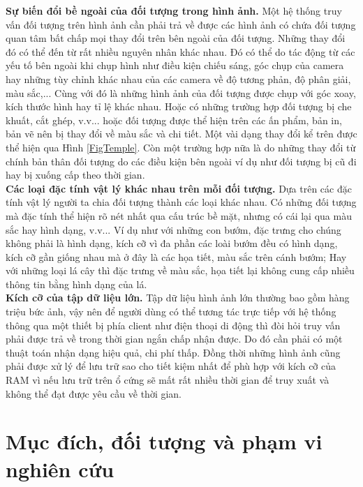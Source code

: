  \textbf{Sự biến đổi bề ngoài của đối tượng trong hình ảnh.} Một hệ thống truy vấn đối tượng trên hình ảnh cần phải trả về được các hình ảnh có chứa đối tượng quan tâm bất chấp mọi thay đổi trên bên ngoài của đối tượng. Những thay đổi đó có thể đến từ rất nhiều nguyên nhân khác nhau. Đó có thể do tác động từ các yếu tố bên ngoài khi chụp hình như điều kiện chiếu sáng, góc chụp của camera hay những tùy chỉnh khác nhau của các camera về độ tương phản, độ phân giải, màu sắc,... Cùng với đó là những hình ảnh của đối tượng được chụp với góc xoay, kích thước hình hay tỉ lệ khác nhau. Hoặc có những trường hợp đối tượng bị che khuất, cắt ghép, v.v... hoặc đối tượng được thể hiện trên các ấn phẩm, bản in, bản vẽ nên bị thay đổi về màu sắc và chi tiết. Một vài dạng thay đổi kể trên được thể hiện qua Hình \ref{FigTemple}. Còn một trường hợp nữa là do những thay đổi từ chính bản thân đối tượng do các điều kiện bên ngoài ví dụ như đối tượng bị cũ đi hay bị xuống cấp theo thời gian.\\ 
 \textbf{Các loại đặc tính vật lý khác nhau trên mỗi đối tượng.} Dựa trên các đặc tính vật lý người ta chia đối tượng thành các loại khác nhau. Có những đối tượng mà đặc tính thể hiện rõ nét nhất qua cấu trúc bề mặt, nhưng có cái lại qua màu sắc hay hình dạng, v.v... Ví dụ như với những con bướm, đặc trưng cho chúng không phải là hình dạng, kích cỡ vì đa phần các loài bướm đều có hình dạng, kích cỡ gần giống nhau mà ở đây là các họa tiết, màu sắc trên cánh bướm; Hay với những loại lá cây thì đặc trưng về màu sắc, họa tiết lại không cung cấp nhiều thông tin bằng hình dạng của lá.\\
 \textbf{Kích cỡ của tập dữ liệu lớn.} Tập dữ liệu hình ảnh lớn thường bao gồm hàng triệu bức ảnh, vậy nên để người dùng có thể tương tác trực tiếp với hệ thống thông qua một thiết bị phía client như điện thoại di động thì đòi hỏi truy vấn phải được trả về trong thời gian ngắn chấp nhận được. Do đó cần phải có một thuật toán nhận dạng hiệu quả, chi phí thấp. Đồng thời những hình ảnh cũng phải được xử lý để lưu trữ sao cho tiết kiệm nhất để phù hợp với kích cỡ của RAM vì nếu lưu trữ trên ổ cứng sẽ mất rất nhiều thời gian để truy xuất và không thể đạt được yêu cầu về thời gian.\\
 
\section{Mục đích, đối tượng và phạm vi nghiên cứu}

